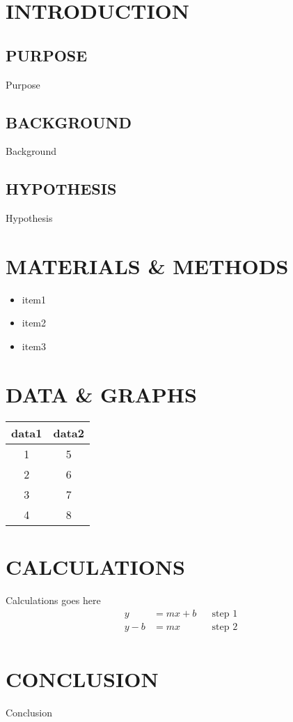 \documentclass{article}
\title{\experimentTitle{}}
\author{
    \first{} \last{}\\
    Partners:\\
    \partners{}\\
    Instructor: \instructor{}
}
\begin{document}
\clearpage
\maketitle
\thispagestyle{empty}
\clearpage
{}
\newpage

\pagestyle{useheader}
\tableofcontents
\newpage

\section{INTRODUCTION}
    \subsection{PURPOSE}
        Purpose
    \subsection{BACKGROUND}
        Background
    \subsection{HYPOTHESIS}
        Hypothesis
\section{MATERIALS \& METHODS}
    \begin{itemize}
        \item item1
        \item item2
        \item item3
    \end{itemize}
\section{DATA \& GRAPHS}
    \begin{tabular}{ |c|c| } 
        \hline
            data1 & data2 \\
        \hline
        1 & 5 \\
        2 & 6 \\
        3 & 7 \\
        4 & 8 \\
        \hline
        \end{tabular}
\section{CALCULATIONS}
    Calculations goes here
    \begin{align*}
        y &= mx + b && \text{step 1}\\
        y - b &= mx && \text{step 2}\\
    \end{align*}
\section{CONCLUSION}
    Conclusion
\end{document}
